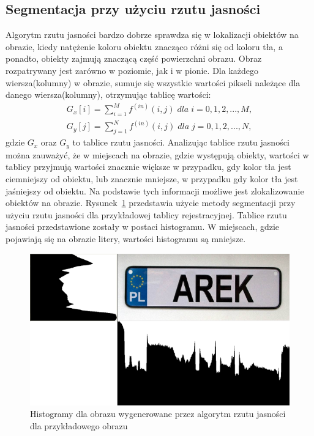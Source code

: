 \subsection{Segmentacja przy użyciu rzutu jasności} \label{ssec:rzut_jasnosci}
Algorytm rzutu jasności bardzo dobrze sprawdza się w lokalizacji obiektów na obrazie, kiedy natężenie koloru obiektu znacząco różni się od koloru tła, a ponadto, obiekty zajmują znaczącą część powierzchni obrazu. Obraz rozpatrywany jest zarówno w poziomie, jak i w pionie. Dla każdego wiersza(kolumny) w obrazie, sumuje się wszystkie wartości pikseli należące dla danego wiersza(kolumny), otrzymując tablicę wartości:
\begin{gather*}
  G_x[i] = \sum\limits_{i=1}^M f^{(in)}(i, j) \; dla \; i = 0,1,2,...,M, \\
  G_y[j] = \sum\limits_{j=1}^N f^{(in)}(i, j) \; dla \; j = 0,1,2,...,N,
\end{gather*} gdzie $G_x$ oraz $G_y$ to tablice rzutu jasności. Analizując tablice rzutu jasności można zauważyć, że w miejscach na obrazie, gdzie występują obiekty, wartości w tablicy przyjmują wartości znacznie większe w przypadku, gdy kolor tła jest ciemniejszy od obiektu, lub znacznie mniejsze, w przypadku gdy kolor tła jest jaśniejszy od obiektu. Na podstawie tych informacji możliwe jest zlokalizowanie obiektów na obrazie. Rysunek~\ref{fig:rzut_jasnosci} przedstawia użycie metody segmentacji przy użyciu rzutu jasności dla przykładowej tablicy rejestracyjnej. Tablice rzutu jasności przedstawione zostały w postaci histogramu. W miejscach, gdzie pojawiają się na obrazie litery, wartości histogramu są mniejsze.

\begin{figure}
  \centering
  \includegraphics[width=15cm]{img/rzut-jasnosci}
  \caption{Histogramy dla obrazu wygenerowane przez algorytm rzutu jasności dla przykładowego obrazu}
  \label{fig:rzut_jasnosci}
\end{figure}
